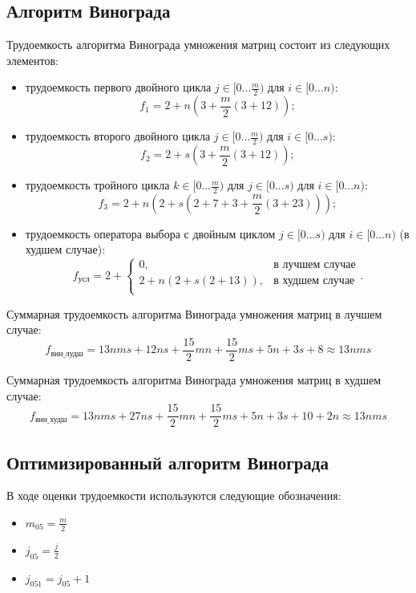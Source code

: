 \subsection{Алгоритм Винограда}
Трудоемкость алгоритма Винограда умножения матриц состоит из следующих элементов:
\begin{itemize}
	\item трудоемкость первого двойного цикла $j \in [0...\frac{m}{2})$ для $i \in [0...n)$:
	\begin{equation}
		f_1 = 2 + n(3 + \frac{m}{2}(3 + 12));
	\end{equation}
	\item трудоемкость второго двойного цикла $j \in [0...\frac{m}{2})$ для $i \in [0...s)$:
	\begin{equation}
		f_2 = 2 + s(3 + \frac{m}{2}(3 + 12));
	\end{equation}
	\item трудоемкость тройного цикла  $k \in [0...\frac{m}{2})$ для $j \in [0...s)$ для $i \in [0...n)$:
	\begin{equation}
		f_3 = 2 + n(2 + s(2 + 7 + 3 + \frac{m}{2}(3 + 23)));
	\end{equation}
	\item трудоемкость оператора выбора с двойным циклом $j \in [0...s)$ для $i \in [0...n)$ (в худшем случае):
	\begin{equation}
		f_{\text{усл}} = 2 + 
		\begin{cases}
			0, & \text{в лучшем случае}\\
			2 + n(2 + s(2 + 13)), & \text{в худшем случае}\\
		\end{cases}.
	\end{equation}
\end{itemize}

Суммарная трудоемкость алгоритма Винограда умножения матриц в лучшем случае:
\begin{equation}
	f_{\text{вин\_лудш}} = 13nms + 12ns + \frac{15}{2}mn + \frac{15}{2}ms + 5n + 3s + 8 \approx 13nms
\end{equation}

Суммарная трудоемкость алгоритма Винограда умножения матриц в худшем случае:
\begin{equation}
	f_{\text{вин\_худш}} = 13nms + 27ns + \frac{15}{2}mn + \frac{15}{2}ms + 5n + 3s + 10 + 2n\approx 13nms
\end{equation}


\subsection{Оптимизированный алгоритм Винограда}
В ходе оценки трудоемкости используются следующие обозначения:
\begin{itemize}
		\item $m_{05} = \frac{m}{2}$
		\item $j_{05} = \frac{j}{2}$
		\item $j_{051} = j_{05} + 1$
\end{itemize}

